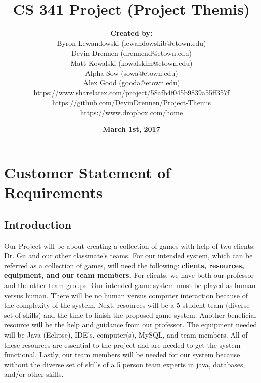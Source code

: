 \documentclass[11pt,a4paper]{article}
\begin{document}
\title{\textbf{CS 341 Project (Project Themis)}}
\author{\textbf{Created by:} \\\Large Byron Lewandowski (lewandowskib@etown.edu) \\\Large Devin Drennen (drennend@etown.edu)\\\Large Matt Kowalski (kowalskim@etown.edu)   \\\Large Alpha Sow (sowa@etown.edu)  \\\Large Alex Good (gooda@etown.edu) \\https://www.sharelatex.com/project/58afb4f045b9839a55ff357f 
\\https://github.com/DevinDrennen/Project-Themis 
\\https://www.dropbox.com/home }

\date{\textbf{March 1st, 2017}}
\maketitle

\tableofcontents\clearpage

\listoffigures\clearpage
\listoftables\clearpage

\setcounter{secnumdepth}{2}
\setcounter{tocdepth}{2}





\section{Customer Statement of Requirements}

\subsection{Introduction}

Our Project will be about creating a collection of games with help of two clients: Dr. Gu and our other classmate's teams. For our intended system, which can be referred as a collection of games, will need the following: \textbf{clients, resources, equipment, and our team members.} For clients, we have both our professor and the other team groups. Our intended game system must be played as human versus human. There will be no human versus computer interaction because of the complexity of the system. Next, resources will be a 5 student-team (diverse set of skills) and the time to finish the proposed game system. Another beneficial resource will be the help and guidance from our professor. The equipment needed will be Java (Eclipse), IDE's, computer(s), MySQL, and team members. All of these resources are essential to the project and are needed to get the system functional. Lastly, our team members will be needed for our system because without the diverse set of skills of a 5 person team experts in java, databases, and/or other skills. 
\end{document}
